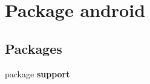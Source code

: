 \section{Package android}
\label{namespaceandroid}
\subsection*{Packages}
\begin{DoxyCompactItemize}
\item 
package \textbf{ support}
\end{DoxyCompactItemize}
